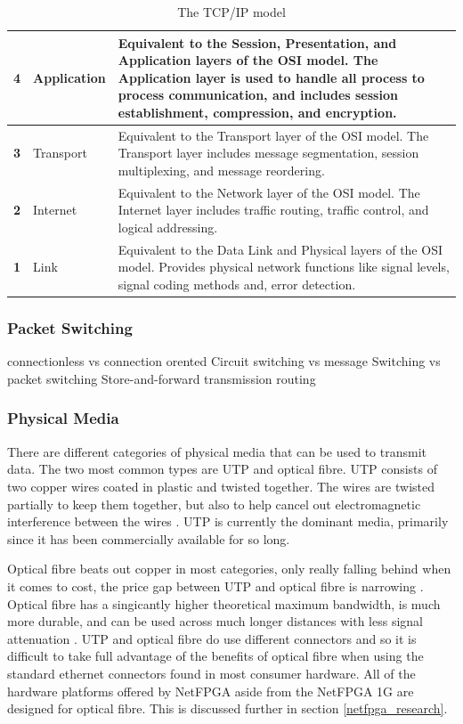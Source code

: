\documentclass[12pt, a4paper, twoside, onecolumn]{article}
\begin{document}
\begin{table}[!ht]
  \begin{center}
    \begin{tabularx}{\textwidth}{|c|l|X|}
      \hline
      \textbf{4} & Application & Equivalent to the Session, Presentation, and Application layers of the OSI model. The Application layer is used to handle all process to process communication, and includes session establishment, compression, and encryption. \\ \hline
      \textbf{3} & Transport & Equivalent to the Transport layer of the OSI model. The Transport layer includes message segmentation, session multiplexing, and message reordering. \\ \hline
      \textbf{2} & Internet & Equivalent to the Network layer of the OSI model. The Internet layer includes traffic routing, traffic control, and logical addressing. \\ \hline
      \textbf{1} & Link & Equivalent to the Data Link and Physical layers of the OSI model. Provides physical network functions like signal levels, signal coding methods and, error detection. \\ \hline
    \end{tabularx}
  \end{center}
  \caption{The TCP/IP model \cite{tcpip_pearson}}
  \label{tcp_ip_model}
\end{table}

\subsubsection{Packet Switching}
connectionless vs connection orented
Circuit switching vs message Switching vs packet switching
Store-and-forward transmission
routing
\subsubsection{Physical Media}
There are different categories of physical media that can be used to transmit data. The two most common types are UTP and optical fibre. UTP consists of two copper wires coated in plastic and twisted together. The wires are twisted partially to keep them together, but also to help cancel out electromagnetic interference between the wires \cite{networks03}. UTP is currently the dominant media, primarily since it has been commercially available for so long.

Optical fibre beats out copper in most categories, only really falling behind when it comes to cost, the price gap between UTP and optical fibre is narrowing \cite{copper_fibre_universal}. Optical fibre has a singicantly higher theoretical maximum bandwidth, is much more durable, and can be used across much longer distances with less signal attenuation \cite{copper_fibre_multicom}. UTP and optical fibre do use different connectors and so it is difficult to take full advantage of the benefits of optical fibre when using the standard ethernet connectors found in most consumer hardware. All of the hardware platforms offered by NetFPGA aside from the NetFPGA 1G \cite{NetFPGA_1G} are designed for optical fibre. This is discussed further in section \ref{netfpga_research}.
\end{document}

